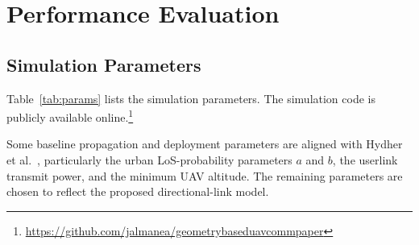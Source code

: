 \documentclass[conference]{IEEEtran}
\begin{document}
%
%


\section{Performance Evaluation}


\subsection{Simulation Parameters}
\label{sec:setup}

Table~\ref{tab:params} lists the simulation parameters. 
The simulation code is publicly available online.\footnote{\url{https://github.com/jalmanea/geometrybaseduavcommpaper}}


Some baseline propagation and deployment parameters are aligned with Hydher et al.~\cite{hydher2020}, particularly the urban LoS-probability parameters $a$ and $b$, the userlink transmit power, and the minimum UAV altitude. The remaining parameters are chosen to reflect the proposed directional-link model.
\end{document}
